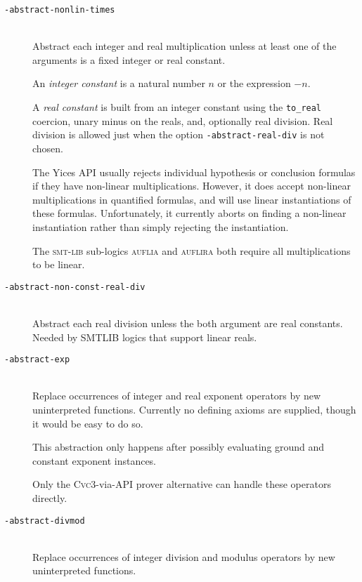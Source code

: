 \documentclass[12pt,fleqn]{article}
\newcommand{\cvcthree}{\textsc{Cvc}3}
\newcommand{\yices}{Yices}
\newcommand{\smtlib}{\textsc{smt-lib}}
\newcommand{\optionb}[1]{\item[\texttt{-{#1}}]\ \\}
\begin{document}
\begin{description}
\optionb{abstract-nonlin-times}
  Abstract each integer and real multiplication unless at least
  one of the arguments is a fixed integer or real constant.

  An \emph{integer constant} is a natural number $n$ or the expression $-n$.
  
  A \emph{real constant} is built from an integer constant using the
  \texttt{to\_real} coercion, unary minus on the reals, and, optionally
  real division.  Real division is allowed just when the option 
  \texttt{-abstract-real-div} is not chosen.

  The \yices{} API usually rejects individual hypothesis or conclusion
  formulas if they have non-linear multiplications.  However, it does
  accept non-linear multiplications in quantified formulas, and
  will use linear instantiations of these formulas. 
  Unfortunately, it currently aborts on finding a non-linear
  instantiation rather than simply rejecting the instantiation.

  The \smtlib{} sub-logics \textsc{auflia} and \textsc{auflira} both 
  require all multiplications to be linear.

\optionb{abstract-non-const-real-div}

  Abstract each real division unless the both argument are real constants.
  Needed by SMTLIB logics that support linear reals.


\optionb{abstract-exp}
  Replace occurrences of integer and real exponent operators by new 
  uninterpreted functions.  Currently no defining axioms are supplied, though
  it would be easy to do so. 

  This abstraction only happens after possibly evaluating ground 
  and constant exponent instances.

  Only the \cvcthree{}-via-API prover alternative can handle these
  operators directly.

\optionb{abstract-divmod}
  Replace occurrences of integer division and modulus operators by new 
  uninterpreted functions.  


\end{description}
\end{document}
